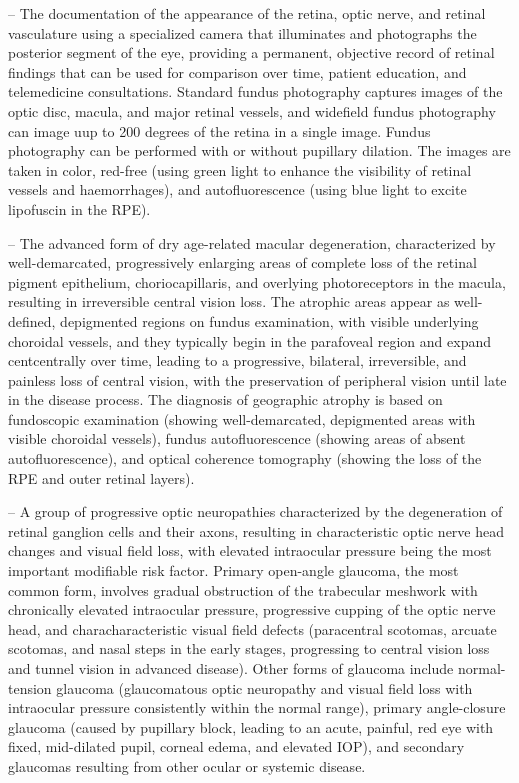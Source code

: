 -- The documentation of the appearance of the retina, optic nerve, and retinal vasculature using a specialized camera that illuminates and photographs the posterior segment of the eye, providing a permanent, objective record of retinal findings that can be used for comparison over time, patient education, and telemedicine consultations. Standard fundus photography captures images of the optic disc, macula, and major retinal vessels, and widefield fundus photography can image uup to 200 degrees of the retina in a single image. Fundus photography can be performed with or without pupillary dilation. The images are taken in color, red-free (using green light to enhance the visibility of retinal vessels and haemorrhages), and autofluorescence (using blue light to excite lipofuscin in the RPE).

-- The advanced form of dry age-related macular degeneration, characterized by well-demarcated, progressively enlarging areas of complete loss of the retinal pigment epithelium, choriocapillaris, and overlying photoreceptors in the macula, resulting in irreversible central vision loss. The atrophic areas appear as well-defined, depigmented regions on fundus examination, with visible underlying choroidal vessels, and they typically begin in the parafoveal region and expand centcentrally over time, leading to a progressive, bilateral, irreversible, and painless loss of central vision, with the preservation of peripheral vision until late in the disease process. The diagnosis of geographic atrophy is based on fundoscopic examination (showing well-demarcated, depigmented areas with visible choroidal vessels), fundus autofluorescence (showing areas of absent autofluorescence), and optical coherence tomography (showing the loss of the RPE and outer retinal layers).

-- A group of progressive optic neuropathies characterized by the degeneration of retinal ganglion cells and their axons, resulting in characteristic optic nerve head changes and visual field loss, with elevated intraocular pressure being the most important modifiable risk factor. Primary open-angle glaucoma, the most common form, involves gradual obstruction of the trabecular meshwork with chronically elevated intraocular pressure, progressive cupping of the optic nerve head, and characharacteristic visual field defects (paracentral scotomas, arcuate scotomas, and nasal steps in the early stages, progressing to central vision loss and tunnel vision in advanced disease). Other forms of glaucoma include normal-tension glaucoma (glaucomatous optic neuropathy and visual field loss with intraocular pressure consistently within the normal range), primary angle-closure glaucoma (caused by pupillary block, leading to an acute, painful, red eye with fixed, mid-dilated pupil, corneal edema, and elevated IOP), and secondary glaucomas resulting from other ocular or systemic disease.


